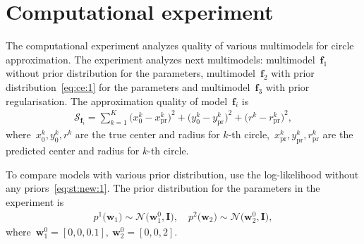 \documentclass[12pt, twoside]{article}
\numberwithin{equation}{section}
\begin{document}
\section{Computational experiment}
The computational experiment analyzes quality of various multimodels for circle approximation.
The experiment analyzes next multimodels: multimodel~$\textbf{f}_1$ without prior distribution for the parameters, multimodel~$\textbf{f}_2$ with prior distribution~\eqref{eq:ce:1} for the parameters and multimodel~$\textbf{f}_3$ with prior regularisation.
The approximation quality of model~$\textbf{f}_i$ is
\[
\label{eq:ce:ex:0:1}
\begin{aligned}
\mathcal{S}_{\textbf{f}_i} = \sum_{k=1}^{K}\bigr(x^{k}_{0}-x^{k}_{\text{pr}}\bigr)^2+\bigr(y^{k}_{0}-y^{k}_{\text{pr}}\bigr)^2+\bigr(r^{k}-r^{k}_{\text{pr}}\bigr)^2,
\end{aligned}
\]
where~$x^{k}_0, y^{k}_0, r^{k}$ are the true center and radius for $k$-th circle,~$x^{k}_{\text{pr}}, y^{k}_{\text{pr}}, r^{k}_{\text{pr}}$ are the predicted center and radius for $k$-th circle.

To compare models with various prior distribution, use the log-likelihood without any priors~\eqref{eq:st:new:1}.
The prior distribution for the parameters in the experiment is
\[
\label{eq:ce:1}
\begin{aligned}
p^{1}\bigr(\textbf{w}_1\bigr)\sim\mathcal{N}\bigr(\textbf{w}^{0}_{1}, \textbf{I}\bigr), \quad p^{2}\bigr(\textbf{w}_2\bigr)\sim\mathcal{N}\bigr(\textbf{w}^{0}_{2}, \textbf{I}\bigr),
\end{aligned}
\]
where~$\textbf{w}^{0}_1 = [0, 0, 0.1],\ \textbf{w}^{0}_2 = [0, 0, 2]$.
\end{document}
